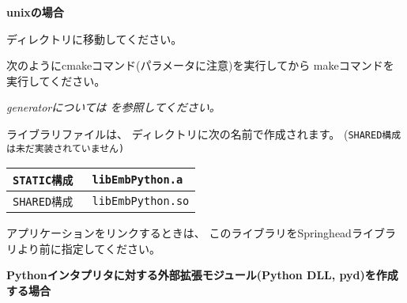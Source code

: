 \medskip
\bf{unixの場合}
\begin{narrow}
	ディレクトリに移動してください。

	次のようにcmakeコマンド(パラメータに注意)を実行してから
	makeコマンドを実行してください。


	\begin{narrow}[s]
		\it{generator}については
		 を参照してください。
	\end{narrow}

	\medskip
	ライブラリファイルは、
	ディレクトリに次の名前で作成されます。
	(\tt{SHARED}構成は未だ実装されていません)

	\medskip
	\begin{narrow}[20pt]
	\begin{tabular}{l@{\ \ ---\ \ }l}\hline
		\tt{STATIC}構成 & \tt{libEmbPython.a}\\\hline
		\tt{SHARED}構成 & \tt{libEmbPython.so}\\\hline
	\end{tabular}
	\end{narrow}

	\bigskip
	アプリケーションをリンクするときは、
	このライブラリをSpringheadライブラリより前に指定してください。
\end{narrow}

\bigskip
\thinrule{\linewidth}

\noindent
\bf{Pythonインタプリタに対する外部拡張モジュール(Python DLL, pyd)を作成する場合}

